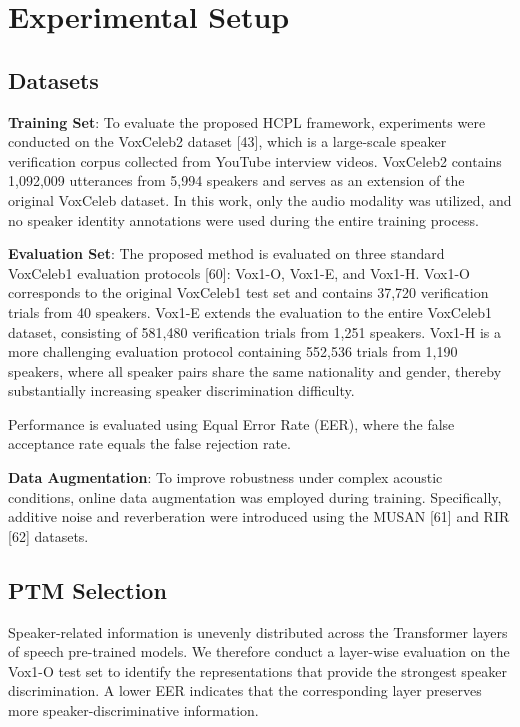 \documentclass[lettersize,journal]{IEEEtran}
\begin{document}
\section{Experimental Setup}

\subsection{Datasets}

\textbf{Training Set}: 
To evaluate the proposed HCPL framework, experiments were conducted on the VoxCeleb2 dataset [43], which is a large-scale speaker verification corpus collected from YouTube interview videos. VoxCeleb2 contains 1,092,009 utterances from 5,994 speakers and serves as an extension of the original VoxCeleb dataset. In this work, only the audio modality was utilized, and no speaker identity annotations were used during the entire training process.

\textbf{Evaluation Set}: 
The proposed method is evaluated on three standard VoxCeleb1 evaluation protocols [60]: Vox1-O, Vox1-E, and Vox1-H. Vox1-O corresponds to the original VoxCeleb1 test set and contains 37,720 verification trials from 40 speakers. Vox1-E extends the evaluation to the entire VoxCeleb1 dataset, consisting of 581,480 verification trials from 1,251 speakers. Vox1-H is a more challenging evaluation protocol containing 552,536 trials from 1,190 speakers, where all speaker pairs share the same nationality and gender, thereby substantially increasing speaker discrimination difficulty.

Performance is evaluated using Equal Error Rate (EER), where the false acceptance rate equals the false rejection rate.


\textbf{Data Augmentation}: 
To improve robustness under complex acoustic conditions, online data augmentation was employed during training. Specifically, additive noise and reverberation were introduced using the MUSAN [61] and RIR [62] datasets.

\subsection{PTM Selection}

Speaker-related information is unevenly distributed across the
Transformer layers of speech pre-trained models. We therefore conduct
a layer-wise evaluation on the Vox1-O test set to identify the
representations that provide the strongest speaker discrimination.
A lower EER indicates that the corresponding layer preserves more
speaker-discriminative information.
\end{document}
